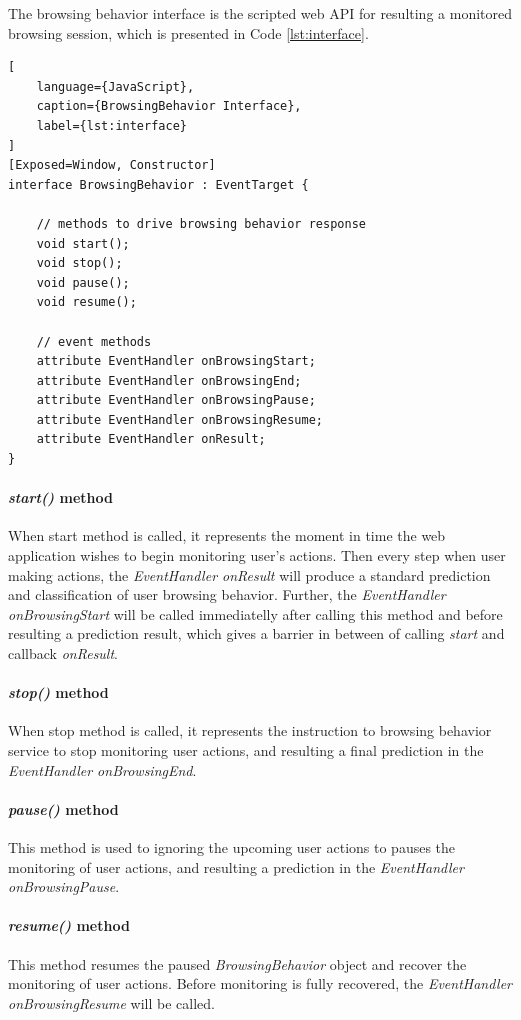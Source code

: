 The browsing behavior interface is the scripted web API for resulting a monitored browsing
session, which is presented in Code \ref{lst:interface}.

\begin{lstlisting}[
    language={JavaScript},
    caption={BrowsingBehavior Interface},
    label={lst:interface}
]
[Exposed=Window, Constructor]
interface BrowsingBehavior : EventTarget {
    
    // methods to drive browsing behavior response
    void start();
    void stop();
    void pause();
    void resume();

    // event methods
    attribute EventHandler onBrowsingStart;
    attribute EventHandler onBrowsingEnd;
    attribute EventHandler onBrowsingPause;
    attribute EventHandler onBrowsingResume;
    attribute EventHandler onResult;
}
\end{lstlisting}

\paragraph{\emph{start()} method} When start method is called, it represents the moment in
time the web application wishes to begin monitoring user's actions.
Then every step when user making actions, the \emph{EventHandler onResult} will produce
a standard prediction and classification of user browsing behavior. Further, 
the \emph{EventHandler onBrowsingStart} will be called immediatelly after calling 
this method and before resulting a prediction result, which gives a barrier in between of
calling \emph{start} and callback \emph{onResult}.

\paragraph{\emph{stop()} method} When stop method is called, it represents the instruction
to browsing behavior service to stop monitoring user actions, and resulting a final 
prediction in the \emph{EventHandler onBrowsingEnd}.

\paragraph{\emph{pause()} method} This method is used to ignoring the upcoming user actions
to pauses the monitoring of user actions, and resulting a prediction in the 
\emph{EventHandler onBrowsingPause}.

\paragraph{\emph{resume()} method} This method resumes the paused \emph{BrowsingBehavior}
object and recover the monitoring of user actions. Before monitoring is fully recovered,
the \emph{EventHandler onBrowsingResume} will be called.

